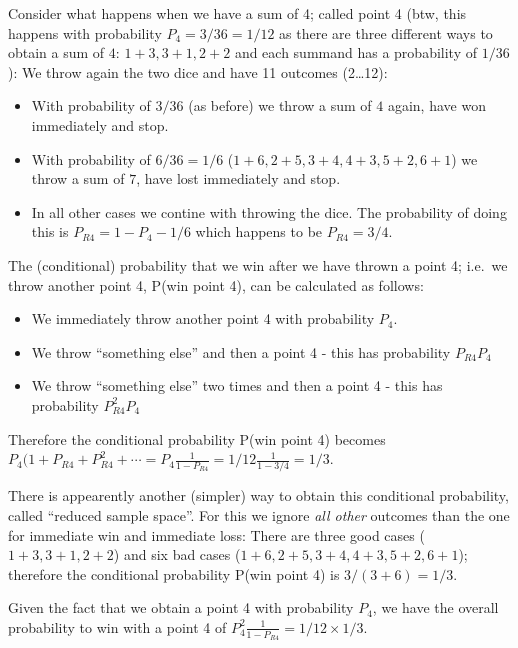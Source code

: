 

Consider what happens when we have a sum of 4; called point 4 (btw, this
happens with probability \(P_4 = 3/36 = 1/12\) as there are three
different ways to obtain a sum of \(4\): \(1+3, 3+1, 2+2\) and each
summand has a probability of \(1/36\)): We throw again the two dice and
have 11 outcomes (2\ldots{}12):

\begin{itemize}
\item
  With probability of \(3/36\) (as before) we throw a sum of \(4\)
  again, have won immediately and stop.
\item
  With probability of \(6/36 = 1/6\) (\(1+6, 2+5, 3+4, 4+3, 5+2, 6+1\))
  we throw a sum of \(7\), have lost immediately and stop.
\item
  In all other cases we contine with throwing the dice. The probability
  of doing this is \(P_{R4} = 1 - P_4 - 1/6\) which happens to be
  \(P_{R4} = 3/4\).
\end{itemize}

The (conditional) probability that we win after we have thrown a point
4; i.e.~we throw another point 4, P(win \textbar{} point 4), can be
calculated as follows:

\begin{itemize}
\item
  We immediately throw another point 4 with probability \(P_4\).
\item
  We throw ``something else'' and then a point 4 - this has probability
  \(P_{R4}P_4\)
\item
  We throw ``something else'' two times and then a point 4 - this has
  probability \(P_{R4}^2 P_4\)
\end{itemize}

Therefore the conditional probability P(win \textbar{} point 4) becomes
\(P_4 (1 + P_{R4} + P_{R4}^2 + \cdots = P_4 \frac{1}{1 - P_{R4}} = 1/12 \frac{1}{1 - 3/4} = 1/3\).

There is appearently another (simpler) way to obtain this conditional
probability, called ``reduced sample space''. For this we ignore
\emph{all other} outcomes than the one for immediate win and immediate
loss: There are three good cases (\(1+3, 3+1, 2+2\)) and six bad cases
(\(1+6, 2+5, 3+4, 4+3, 5+2, 6+1\)); therefore the conditional
probability P(win \textbar{} point 4) is \(3/(3+6) = 1/3\).

Given the fact that we obtain a point 4 with probability \(P_4\), we
have the overall probability to win with a point 4 of
\(P_4^2 \frac{1}{1 - P_{R4}} = 1/12 \times 1/3\).

